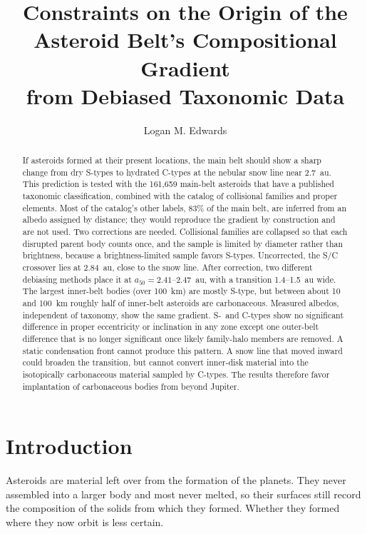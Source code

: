 \documentclass[twocolumn]{aastex701}
\begin{document}
\title{Constraints on the Origin of the Asteroid Belt’s Compositional Gradient \texorpdfstring{\\}{}from Debiased Taxonomic Data}
\author[gname=Logan,sname=Edwards]{Logan M. Edwards}
\begin{abstract}
If asteroids formed at their present locations, the main belt should show a sharp change from dry S-types to hydrated C-types at the nebular snow line near 2.7~au. This prediction is tested with the 161,659 main-belt asteroids that have a published taxonomic classification, combined with the \citet{nesvornyetal2024} catalog of collisional families and proper elements. Most of the catalog's other labels, 83\% of the main belt, are inferred from an albedo assigned by distance; they would reproduce the gradient by construction and are not used. Two corrections are needed. Collisional families are collapsed so that each disrupted parent body counts once, and the sample is limited by diameter rather than brightness, because a brightness-limited sample favors S-types. Uncorrected, the S/C crossover lies at 2.84~au, close to the snow line. After correction, two different debiasing methods place it at $a_{50} = 2.41$–2.47~au, with a transition 1.4–1.5~au wide. The largest inner-belt bodies (over 100~km) are mostly S-type, but between about 10 and 100~km roughly half of inner-belt asteroids are carbonaceous. Measured albedos, independent of taxonomy, show the same gradient. \mbox{S-}~and C-types show no significant difference in proper eccentricity or inclination in any zone except one outer-belt difference that is no longer significant once likely family-halo members are removed. A static condensation front cannot produce this pattern. A snow line that moved inward could broaden the transition, but cannot convert inner-disk material into the isotopically carbonaceous material sampled by C-types. The results therefore favor implantation of carbonaceous bodies from beyond Jupiter.
\end{abstract}

\section{Introduction}\label{sec:1}
Asteroids are material left over from the formation of the planets. They never assembled into a larger body and most never melted, so their surfaces still record the composition of the solids from which they formed. Whether they formed where they now orbit is less certain.
\end{document}
